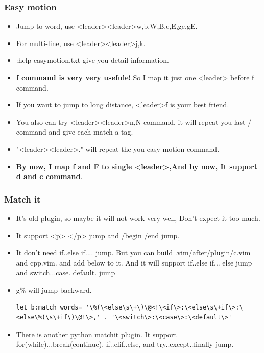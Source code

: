 \documentclass[a4paper,11pt,twoside]{book}
\begin{document}
\subsubsection{Easy motion}
\begin{itemize}
		\item Jump to word, use <leader><leader>w,b,W,B,e,E,ge,gE. 

		\item For multi-line, use <leader><leader>j,k.  

		\item :help easymotion.txt give you detail information.

		\item \textbf{f command is very very usefule!}.So I map it just one <leader> before f command. 

		\item If you want to jump to long distance, <leader>f is your best friend. 

		\item You also can try <leader><leader>n,N command, it will repeat you last / command and give each match a tag.

		\item "<leader><leader>."  will repeat the you easy motion command. 

		\item \textbf{By now, I map f and F to single <leader>,And by now, It support d and c command}.
\end{itemize}

\subsubsection{Match it}
\begin{itemize}
		\item It's old plugin, so maybe it will not work very well, Don't expect it too much.
		\item It support <p> </p> jump and /begin /end jump.

		\item It don't need if..else if.... jump. But you can build .vim/after/plugin/c.vim and cpp.vim. and add below to it. And it will support if..else if... else jump and switch...case. default. jump

		\item g\% will jump backward. 
\begin{verbatim}
let b:match_words= '\%(\<else\s\+\)\@<!\<if\>:\<else\s\+if\>:\<else\%(\s\+if\)\@!\>,' . '\<switch\>:\<case\>:\<default\>'
\end{verbatim}

	\item There is another python matchit plugin. It support for(while)...break(continue). if..elif..else, and try..except..finally jump.   
\end{itemize}
\end{document}
